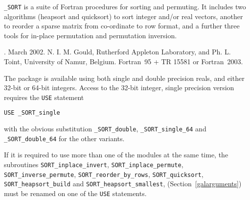 \documentclass{galahad}
\newcommand{\packagename}{SORT}
\newcommand{\fullpackagename}{\libraryname\_\packagename}
\begin{document}
\galheader


\galsummary

{\tt \fullpackagename} is a suite of Fortran procedures for
sorting and permuting.  It includes two algorithms (heapsort and
quicksort) to sort integer and/or real vectors,
another to reorder a sparse matrix from co-ordinate to row format,
and a further three tools for in-place
permutation and permutation inversion.


\galattributes
\galversions{\tt  \fullpackagename\_single, \fullpackagename\_double}.
\galdate March 2002.
\galorigin N. I. M. Gould, Rutherford Appleton Laboratory, and
Ph. L. Toint, University of Namur, Belgium.
\gallanguage Fortran~95 + TR 15581 or Fortran~2003.


\galhowto

The package is available using both single and double precision reals, 
and either 32-bit or 64-bit integers. Access to the 32-bit integer,
single precision version requires the {\tt USE} statement
\medskip

\hspace{8mm} {\tt USE \fullpackagename\_single}

\medskip
\noindent
with the obvious substitution {\tt \fullpackagename\_double},
{\tt \fullpackagename\_single\_64} and 
{\tt \fullpackagename\_double\_64} for the other variants.

\noindent
If it is required to use more than one of the modules at the same time, 
the subroutines
{\tt \packagename\_inplace\_invert},
{\tt \packagename\_inplace\_permute},
{\tt \packagename\_inverse\_permute},
{\tt \packagename\_reorder\_by\_rows},
{\tt \packagename\_quicksort},
{\tt \packagename\_heapsort\_build} and
{\tt \packagename\_heapsort\_\-smallest},
(Section~\ref{galarguments})
must be renamed on one of the {\tt USE} statements.





\galarguments
\end{document}
